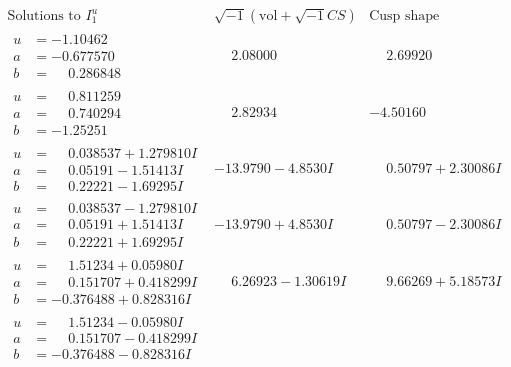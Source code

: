 \documentclass[1p]{elsarticle_modified}
\theoremstyle{definition}
\newcommand{\I}{\sqrt{-1}}
\begin{document}
$$\begin{array}{c|c|c}  
\text{Solutions to }I^u_{1}& \I (\text{vol} + \sqrt{-1}CS) & \text{Cusp shape}\\
 \hline 
\begin{aligned}
u &= -1.10462\phantom{ +0.000000I} \\
a &= -0.677570\phantom{ +0.000000I} \\
b &= \phantom{-}0.286848\phantom{ +0.000000I}\end{aligned}
 & \phantom{-}2.08000\phantom{ +0.000000I} & \phantom{-}2.69920\phantom{ +0.000000I} \\ \hline\begin{aligned}
u &= \phantom{-}0.811259\phantom{ +0.000000I} \\
a &= \phantom{-}0.740294\phantom{ +0.000000I} \\
b &= -1.25251\phantom{ +0.000000I}\end{aligned}
 & \phantom{-}2.82934\phantom{ +0.000000I} & -4.50160\phantom{ +0.000000I} \\ \hline\begin{aligned}
u &= \phantom{-}0.038537 + 1.279810 I \\
a &= \phantom{-}0.05191 - 1.51413 I \\
b &= \phantom{-}0.22221 - 1.69295 I\end{aligned}
 & -13.9790 - 4.8530 I & \phantom{-}0.50797 + 2.30086 I \\ \hline\begin{aligned}
u &= \phantom{-}0.038537 - 1.279810 I \\
a &= \phantom{-}0.05191 + 1.51413 I \\
b &= \phantom{-}0.22221 + 1.69295 I\end{aligned}
 & -13.9790 + 4.8530 I & \phantom{-}0.50797 - 2.30086 I \\ \hline\begin{aligned}
u &= \phantom{-}1.51234 + 0.05980 I \\
a &= \phantom{-}0.151707 + 0.418299 I \\
b &= -0.376488 + 0.828316 I\end{aligned}
 & \phantom{-}6.26923 - 1.30619 I & \phantom{-}9.66269 + 5.18573 I \\ \hline\begin{aligned}
u &= \phantom{-}1.51234 - 0.05980 I \\
a &= \phantom{-}0.151707 - 0.418299 I \\
b &= -0.376488 - 0.828316 I\end{aligned}

\end{array}$$
\end{document}
